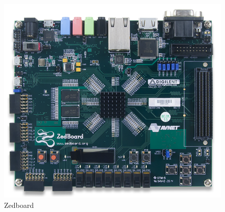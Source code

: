 \documentclass[12pt, a4paper, oneside]{article}
\begin{document}
	    	\begin{figure}[tbh!]
	    		\begin{center}
	    			\includegraphics[scale=2.5]{zedboard.png}
	    			\caption{Zedboard}
	    			\label{fig:Zedboad}
	    		\end{center}
	    	\end{figure}
    	
\end{document}
